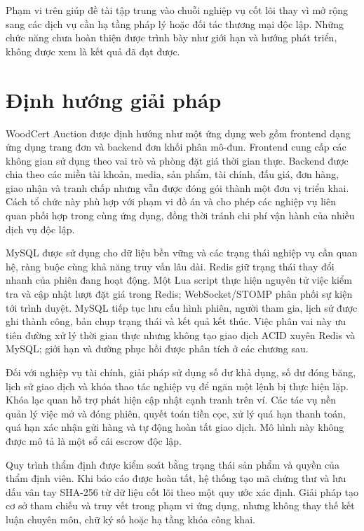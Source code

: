 \documentclass[../DoAn.tex]{subfiles}
\begin{document}
Phạm vi trên giúp đề tài tập trung vào chuỗi nghiệp vụ cốt lõi thay vì mở rộng sang các dịch vụ cần hạ tầng pháp lý hoặc đối tác thương mại độc lập. Những chức năng chưa hoàn thiện được trình bày như giới hạn và hướng phát triển, không được xem là kết quả đã đạt được.

\section{Định hướng giải pháp}
\label{section:1.3}

WoodCert Auction được định hướng như một ứng dụng web gồm frontend dạng ứng dụng trang đơn và backend đơn khối phân mô-đun. Frontend cung cấp các không gian sử dụng theo vai trò và phòng đặt giá thời gian thực. Backend được chia theo các miền tài khoản, media, sản phẩm, tài chính, đấu giá, đơn hàng, giao nhận và tranh chấp nhưng vẫn được đóng gói thành một đơn vị triển khai. Cách tổ chức này phù hợp với phạm vi đồ án và cho phép các nghiệp vụ liên quan phối hợp trong cùng ứng dụng, đồng thời tránh chi phí vận hành của nhiều dịch vụ độc lập.

MySQL được sử dụng cho dữ liệu bền vững và các trạng thái nghiệp vụ cần quan hệ, ràng buộc cùng khả năng truy vấn lâu dài. Redis giữ trạng thái thay đổi nhanh của phiên đang hoạt động. Một Lua script thực hiện nguyên tử việc kiểm tra và cập nhật lượt đặt giá trong Redis; WebSocket/STOMP phân phối sự kiện tới trình duyệt. MySQL tiếp tục lưu cấu hình phiên, người tham gia, lịch sử được ghi thành công, bản chụp trạng thái và kết quả kết thúc. Việc phân vai này ưu tiên đường xử lý thời gian thực nhưng không tạo giao dịch ACID xuyên Redis và MySQL; giới hạn và đường phục hồi được phân tích ở các chương sau.

Đối với nghiệp vụ tài chính, giải pháp sử dụng số dư khả dụng, số dư đóng băng, lịch sử giao dịch và khóa thao tác nghiệp vụ để ngăn một lệnh bị thực hiện lặp. Khóa lạc quan hỗ trợ phát hiện cập nhật cạnh tranh trên ví. Các tác vụ nền quản lý việc mở và đóng phiên, quyết toán tiền cọc, xử lý quá hạn thanh toán, quá hạn xác nhận gửi hàng và tự động hoàn tất giao dịch. Mô hình này không được mô tả là một sổ cái escrow độc lập.

Quy trình thẩm định được kiểm soát bằng trạng thái sản phẩm và quyền của thẩm định viên. Khi báo cáo được hoàn tất, hệ thống tạo mã chứng thư và lưu dấu vân tay SHA-256 từ dữ liệu cốt lõi theo một quy ước xác định. Giải pháp tạo cơ sở tham chiếu và truy vết trong phạm vi ứng dụng, nhưng không thay thế kết luận chuyên môn, chữ ký số hoặc hạ tầng khóa công khai.
\end{document}
